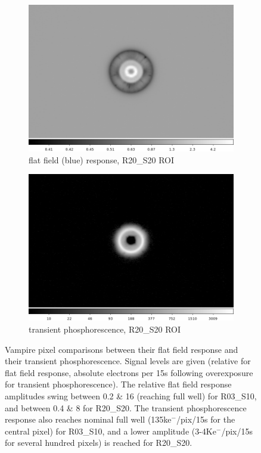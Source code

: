 \begin{figure}[!htbp]
\begin{subfigure}{0.45\textwidth}
    \includegraphics[width=\textwidth]{figures/phosphorescence-survey/vamp_comp_R20_S20_flatresp.png}
     \caption{flat field (blue) response, R20\_S20 ROI}
     \label{subfig:flatresp_R20_S20}
\end{subfigure}
\begin{subfigure}{0.45\textwidth}
    \includegraphics[width=\textwidth]{figures/phosphorescence-survey/vamp_comp_R20_S20_phosresp.png}
     \caption{transient phosphorescence, R20\_S20 ROI}
     \label{subfig:phosresp_R20_S20}
\end{subfigure}
\newline
\caption{Vampire pixel comparisons between their flat field response and their transient phosphorescence. Signal levels are given (relative for flat field response, absolute electrons per 15s following overexposure for transient phosphorescence). The relative flat field response amplitudes swing between 0.2 \& 16 (reaching full well) for R03\_S10, and between 0.4 \& 8 for R20\_S20. The transient phosphorescence response also reaches nominal full well (135ke$^-$/pix/15s for the central pixel) for R03\_S10, and a lower amplitude (3-4Ke$^-$/pix/15s for several hundred pixels) is reached for R20\_S20.}
\label{fig:vamp-phos:R03_S10-R20_S20}
\end{figure}

